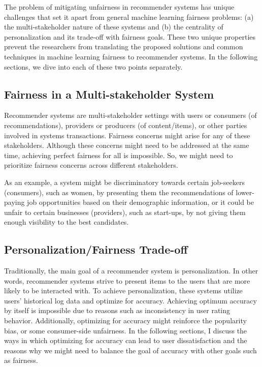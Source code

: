 The problem of mitigating unfairness in recommender systems has unique challenges that set it apart from general machine learning fairness problems: (a) the multi-stakeholder nature of these systems and (b) the centrality of personalization and its trade-off with fairness goals. These two unique properties prevent the researchers from translating the proposed solutions and common techniques in machine learning fairness to recommender systems. In the following sections, we dive into each of these two points separately.


\subsection{Fairness in a Multi-stakeholder System}

Recommender systems are multi-stakeholder settings with users or consumers (of recommendations), providers or producers (of content/items), or other parties involved in systems transactions. Fairness concerns might arise for any of these stakeholders. Although these concerns might need to be addressed at the same time, achieving perfect fairness for all is impossible. So, we might need to prioritize fairness concerns across different stakeholders.

As an example, a system might be discriminatory towards certain job-seekers (consumers), such as women, by presenting them the recommendations of lower-paying job opportunities based on their demographic information, or it could be unfair to certain businesses (providers), such as start-ups, by not giving them enough visibility to the best candidates.


\subsection{Personalization/Fairness Trade-off}

Traditionally, the main goal of a recommender system is personalization. In other words, recommender systems strive to present items to the users that are more likely to be interacted with. To achieve personalization, these systems utilize users' historical log data and optimize for accuracy. Achieving optimum accuracy by itself is impossible due to reasons such as inconsistency in user rating behavior. Additionally, optimizing for accuracy might reinforce the popularity bias, or some consumer-side unfairness. In the following sections, I discuss the ways in which optimizing for accuracy can lead to user dissatisfaction and the reasons why we might need to balance the goal of accuracy with other goals such as fairness.


